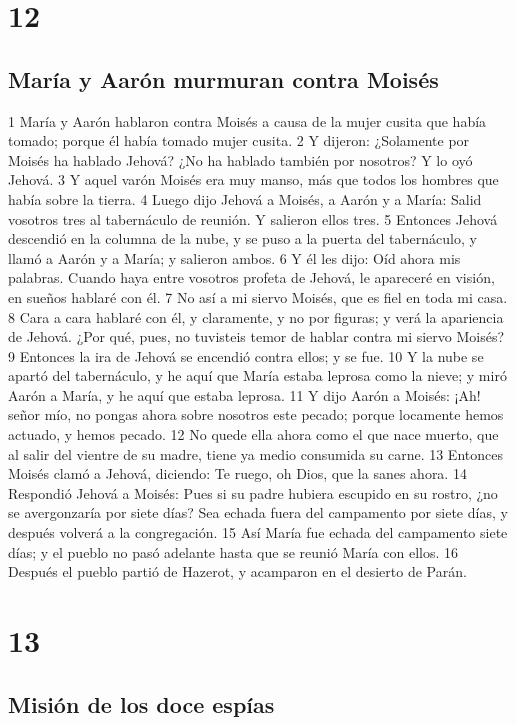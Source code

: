 \chapter{12}

\section*{María y Aarón murmuran contra Moisés}


1 María y Aarón hablaron contra Moisés a causa de la mujer cusita que había tomado; porque él había tomado mujer cusita.
2 Y dijeron: ¿Solamente por Moisés ha hablado Jehová? ¿No ha hablado también por nosotros? Y lo oyó Jehová.
3 Y aquel varón Moisés era muy manso, más que todos los hombres que había sobre la tierra.
4 Luego dijo Jehová a Moisés, a Aarón y a María: Salid vosotros tres al tabernáculo de reunión. Y salieron ellos tres.
5 Entonces Jehová descendió en la columna de la nube, y se puso a la puerta del tabernáculo, y llamó a Aarón y a María; y salieron ambos. 
6 Y él les dijo: Oíd ahora mis palabras. Cuando haya entre vosotros profeta de Jehová, le apareceré en visión, en sueños hablaré con él.
7 No así a mi siervo Moisés, que es fiel en toda mi casa.
8 Cara a cara hablaré con él, y claramente, y no por figuras; y verá la apariencia de Jehová. ¿Por qué, pues, no tuvisteis temor de hablar contra mi siervo Moisés?
9 Entonces la ira de Jehová se encendió contra ellos; y se fue.
10 Y la nube se apartó del tabernáculo, y he aquí que María estaba leprosa como la nieve; y miró Aarón a María, y he aquí que estaba leprosa.
11 Y dijo Aarón a Moisés: ¡Ah! señor mío, no pongas ahora sobre nosotros este pecado; porque locamente hemos actuado, y hemos pecado.
12 No quede ella ahora como el que nace muerto, que al salir del vientre de su madre, tiene ya medio consumida su carne.
13 Entonces Moisés clamó a Jehová, diciendo: Te ruego, oh Dios, que la sanes ahora.
14 Respondió Jehová a Moisés: Pues si su padre hubiera escupido en su rostro, ¿no se avergonzaría por siete días? Sea echada fuera del campamento por siete días, y después volverá a la congregación.
15 Así María fue echada del campamento siete días; y el pueblo no pasó adelante hasta que se reunió María con ellos.
16 Después el pueblo partió de Hazerot, y acamparon en el desierto de Parán.

\chapter{13}

\section*{Misión de los doce espías }


